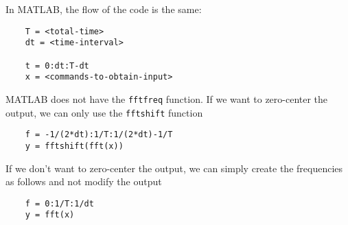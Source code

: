 \documentclass{revtex4-2}
\begin{document}
In MATLAB, the flow of the code is the same:
\begin{verbatim}
    T = <total-time>
    dt = <time-interval>

    t = 0:dt:T-dt
    x = <commands-to-obtain-input>
\end{verbatim}

MATLAB does not have the {\tt fftfreq} function. If we want to zero-center the output, we can only use
the {\tt fftshift} function
\begin{verbatim}
    f = -1/(2*dt):1/T:1/(2*dt)-1/T
    y = fftshift(fft(x))
\end{verbatim}

If we don't want to zero-center the output, we can simply create the frequencies as follows and not modify
the output
\begin{verbatim}
    f = 0:1/T:1/dt
    y = fft(x)
\end{verbatim}
\end{document}
